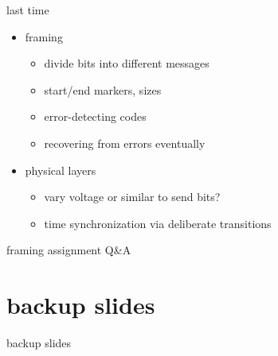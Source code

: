 \date{}
\title{}
\date{}
\usepackage{pgfplots}
\pgfplotsset{compat=1.16}

\begin{frame}
    \titlepage
\end{frame}

\begin{frame}{last time}
    \begin{itemize}
    \item framing
        \begin{itemize}
        \item divide bits into different messages
        \item start/end markers, sizes
        \item error-detecting codes
        \item recovering from errors eventually
        \end{itemize}
    \item physical layers
        \begin{itemize}
        \item vary voltage or similar to send bits?
        \item time synchronization via deliberate transitions
        \end{itemize}
    \end{itemize}
\end{frame}

\begin{frame}{framing assignment Q\&A}
\end{frame}



\section{backup slides}
\begin{frame}{backup slides}
\end{frame}



